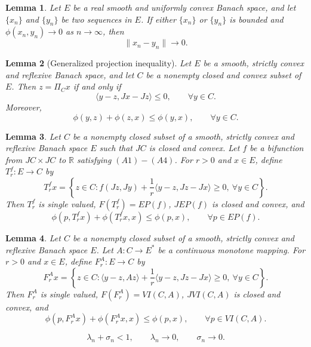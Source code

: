 \documentclass[10pt,a4paper]{amsart}
\newtheorem{lemma}{Lemma}
\begin{document}
\begin{lemma}\label{phitozero}
Let $E$ be a real smooth and uniformly convex Banach space, and let $\{x_n\}$ and $\{y_n\}$ be two sequences in $E$. If either $\{x_n\}$ or $\{y_n\}$ is bounded and $\phi(x_n,y_n)\to 0$ as $n\to\infty$, then
\[
\|x_n-y_n\|\to 0.
\]
\end{lemma}

\begin{lemma}[Generalized projection inequality]\label{projineq}
Let $E$ be a smooth, strictly convex and reflexive Banach space, and let $C$ be a nonempty closed and convex subset of $E$. Then $z=\Pi_Cx$ if and only if
\[
\langle y-z,Jx-Jz\rangle\leq 0,
\qquad \forall y\in C.
\]
Moreover,
\[
\phi(y,z)+\phi(z,x)\leq \phi(y,x),
\qquad \forall y\in C.
\]
\end{lemma}

\begin{lemma}\label{EPrezolvent}
Let $C$ be a nonempty closed subset of a smooth, strictly convex and reflexive Banach space $E$ such that $JC$ is closed and convex. Let $f$ be a bifunction from $JC\times JC$ to $\mathbb{R}$ satisfying $(A1)-(A4)$. For $r>0$ and $x\in E$, define $T_r^f:E\to C$ by
\[
T_r^f x=\left\{z\in C:f(Jz,Jy)+\frac{1}{r}\langle y-z,Jz-Jx\rangle\geq 0,\ \forall y\in C\right\}.
\]
Then $T_r^f$ is single valued, $F(T_r^f)=EP(f)$, $JEP(f)$ is closed and convex, and
\[
\phi(p,T_r^f x)+\phi(T_r^f x,x)\leq \phi(p,x),\qquad \forall p\in EP(f).
\]
\end{lemma}

\begin{lemma}\label{VIrezolvent}
Let $C$ be a nonempty closed subset of a smooth, strictly convex and reflexive Banach space $E$. Let $A:C\to E^{*}$ be a continuous monotone mapping. For $r>0$ and $x\in E$, define $F_r^A:E\to C$ by
\[
F_r^A x=\left\{z\in C:\langle y-z,Az\rangle+\frac{1}{r}\langle y-z,Jz-Jx\rangle\geq 0,\ \forall y\in C\right\}.
\]
Then $F_r^A$ is single valued, $F(F_r^A)=VI(C,A)$, $JVI(C,A)$ is closed and convex, and
\[
\phi(p,F_r^A x)+\phi(F_r^A x,x)\leq \phi(p,x),\qquad \forall p\in VI(C,A).
\]
\end{lemma}

\begin{equation}\label{lambdacond}
\lambda_n+\sigma_n<1,
\qquad \lambda_n\to 0,
\qquad \sigma_n\to 0.
\end{equation}
\end{document}
